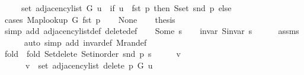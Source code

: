 \begin{isabellebody}
\ \ \ \ \ set\ {\isacharparenleft}{\kern0pt}adjacency{\isacharunderscore}{\kern0pt}list\ G\ u{\isacharparenright}{\kern0pt}\ {\isacharminus}{\kern0pt}\ {\isacharparenleft}{\kern0pt}if\ u\ {\isacharequal}{\kern0pt}\ fst\ p\ then\ S{\isachardot}{\kern0pt}set\ {\isacharparenleft}{\kern0pt}snd\ p{\isacharparenright}{\kern0pt}\ else\ {\isacharbraceleft}{\kern0pt}{\isacharbraceright}{\kern0pt}{\isacharparenright}{\kern0pt}{\isachardoublequoteclose}\isanewline
%
\isadelimproof
%
\endisadelimproof
%
\isatagproof
{}\isamarkupfalse%
\ {\isacharparenleft}{\kern0pt}cases\ {\isachardoublequoteopen}Map{\isacharunderscore}{\kern0pt}lookup\ G\ {\isacharparenleft}{\kern0pt}fst\ p{\isacharparenright}{\kern0pt}{\isachardoublequoteclose}{\isacharparenright}{\kern0pt}\isanewline
\ \ \isamarkupfalse%
\ None\isanewline
\ \ \isamarkupfalse%
\ {\isacharquery}{\kern0pt}thesis\isanewline
\ \ \ \ \isamarkupfalse%
\ {\isacharparenleft}{\kern0pt}simp\ add{\isacharcolon}{\kern0pt}\ adjacency{\isacharunderscore}{\kern0pt}list{\isacharunderscore}{\kern0pt}def\ delete{\isacharunderscore}{\kern0pt}{}{\isacharunderscore}{\kern0pt}def{\isacharparenright}{\kern0pt}\isanewline
{}\isamarkupfalse%
\isanewline
\ \ \isamarkupfalse%
\ {\isacharparenleft}{\kern0pt}Some\ s{\isacharprime}{\kern0pt}{\isacharparenright}{\kern0pt}\isanewline
\ \ \isamarkupfalse%
\ invar{\isacharcolon}{\kern0pt}\ {\isachardoublequoteopen}S{\isachardot}{\kern0pt}invar\ s{\isacharprime}{\kern0pt}{\isachardoublequoteclose}\isanewline
\ \ \ \ \isamarkupfalse%
\ assms\isanewline
\ \ \ \ \isamarkupfalse%
\ {\isacharparenleft}{\kern0pt}auto\ simp\ add{\isacharcolon}{\kern0pt}\ invar{\isacharunderscore}{\kern0pt}def\ M{\isachardot}{\kern0pt}ran{\isacharunderscore}{\kern0pt}def{\isacharparenright}{\kern0pt}\isanewline
\ \ \isamarkupfalse%
\ {\isacharquery}{\kern0pt}fold\ {\isacharequal}{\kern0pt}\ {\isachardoublequoteopen}fold\ Set{\isacharunderscore}{\kern0pt}delete\ {\isacharparenleft}{\kern0pt}Set{\isacharunderscore}{\kern0pt}inorder\ {\isacharparenleft}{\kern0pt}snd\ p{\isacharparenright}{\kern0pt}{\isacharparenright}{\kern0pt}\ s{\isacharprime}{\kern0pt}{\isachardoublequoteclose}\isanewline
\ \ \isacommand{{\isacharbraceleft}{\kern0pt}}\isamarkupfalse%
\ \isamarkupfalse%
\ v\isanewline
\ \ \ \ \isamarkupfalse%
\isanewline
\ \ \ \ \ \ {\isachardoublequoteopen}v\ {\isasymin}\ set\ {\isacharparenleft}{\kern0pt}adjacency{\isacharunderscore}{\kern0pt}list\ {\isacharparenleft}{\kern0pt}delete{\isacharunderscore}{\kern0pt}{}\ p\ G{\isacharparenright}{\kern0pt}\ u{\isacharparenright}{\kern0pt}\ {\isasymlongleftrightarrow}\isanewline

\end{isabellebody}
